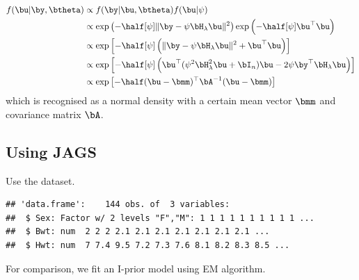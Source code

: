 \documentclass[english, 11pt]{article}
\begin{document}
\begin{align*}
	f(\bu | \by, \btheta) &\propto f(\by | \bu, \btheta) f(\bu | \psi) \\
	&\propto \exp\left(-\half[\psi] \Vert \by - \psi\Hlam\bu \Vert^2 \right)\exp\left(-\half[\psi] \bu^\top\bu \right) \\
	&\propto \exp\left[-\half[\psi] \left( \Vert \by - \psi\Hlam\bu \Vert^2 + \bu^\top\bu \right) \right] \\
	&\propto \exp\left[-\half[\psi] \left( \bu^\top(\psi^2\Hlam^2\bu + \bI_n)\bu - 2\psi\by^\top\Hlam\bu \right)  \right] \\
	&\propto \exp\left[-\half (\bu - \bmm)^\top\bA^{-1}(\bu - \bmm) \right]
\end{align*}
which is recognised as a normal density with a certain mean vector $\bmm$ and covariance matrix $\bA$.

\subsection{Using JAGS}

Use the  dataset.

\begin{knitrout}
\color{fgcolor}\begin{kframe}
\begin{alltt}
  \hlstd{=} \hlstd{)}
\end{alltt}
\begin{verbatim}
## 'data.frame':	144 obs. of  3 variables:
##  $ Sex: Factor w/ 2 levels "F","M": 1 1 1 1 1 1 1 1 1 1 ...
##  $ Bwt: num  2 2 2 2.1 2.1 2.1 2.1 2.1 2.1 2.1 ...
##  $ Hwt: num  7 7.4 9.5 7.2 7.3 7.6 8.1 8.2 8.3 8.5 ...
\end{verbatim}
\end{kframe}
\end{knitrout}

For comparison, we fit an I-prior model using EM algorithm.
\end{document}
